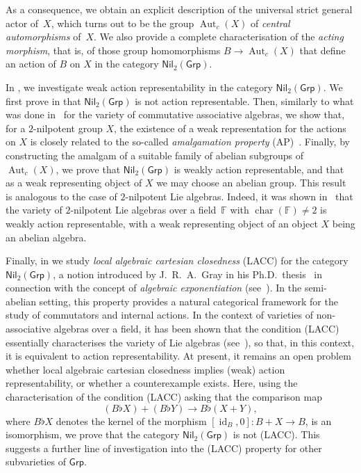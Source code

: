 \documentclass[reqno,hidelinks,a4paper]{amsart}
\theoremstyle{plain}
\theoremstyle{definition}
\theoremstyle{remark}
\numberwithin{equation}{section}
\newcommand*{\CondName}[1]{{\rm (#1)}}
\newcommand*{\LACC}{\CondName{LACC}}
\newcommand{\F}{\mathbb{F}}
\DeclareMathOperator{\bchar}{char}
\DeclareMathOperator{\Aut}{Aut}
\DeclareMathOperator{\id}{id}
\newcommand{\Grp}{\ensuremath{\mathsf{Grp}}}
\newcommand{\Nil}{\ensuremath{\mathsf{Nil}}}
\begin{document}
As a consequence, we obtain an explicit description of the universal strict general actor of~\(X\), which turns out to be the group \(\Aut_c(X)\) of \emph{central automorphisms} of~\(X\). We also provide a complete characterisation of the \emph{acting morphism}, that is, of those group homomorphisms \(B \to \Aut_c(X)\) that define an action of \(B\) on \(X\) in the category \(\Nil_2(\Grp)\).

In , we investigate weak action representability in the category \(\Nil_2(\Grp)\). We first prove in  that \(\Nil_2(\Grp)\) is not action representable. Then, similarly to what was done in~\cite{WRAAlg} for the variety of commutative associative algebras, we show that, for a \(2\)-nilpotent group \(X\), the existence of a weak representation for the actions on \(X\) is closely related to the so-called \emph{amalgamation property} (AP)~\cite{kiss}. Finally, by constructing the amalgam of a suitable family of abelian subgroups of \(\Aut_c(X)\), we prove that \(\Nil_2(\Grp)\) is weakly action representable, and that as a weak representing object of \(X\) we may choose an abelian group. This result is analogous to the case of \(2\)-nilpotent Lie algebras. Indeed, it was shown in~\cite[Theorem 2.21]{WRAAlg} that the variety of \(2\)-nilpotent Lie algebras over a field~\(\F\) with \(\bchar(\F)\neq 2\) is weakly action representable, with a weak representing object of an object \(X\) being an abelian algebra.

Finally, in  we study \emph{local algebraic cartesian closedness} \LACC{} for the category \(\Nil_2(\Grp)\), a notion introduced by J.~R.~A.~Gray in his Ph.D.\ thesis~\cite{GrayThesis} in connection with the concept of \emph{algebraic exponentiation} (see~\cite{BournGray,GrayACS}). In the semi-abelian setting, this property provides a natural categorical framework for the study of commutators and internal actions. In the context of varieties of non-associative algebras over a field, it has been shown that the condition \LACC{} essentially characterises the variety of Lie algebras (see~\cite{GM-VdL2,GM-VdL3,GrayLie}), so that, in this context, it is equivalent to action representability. At present, it remains an open problem whether local algebraic cartesian closedness implies (weak) action representability, or whether a counterexample exists. Here, using the characterisation of the condition \LACC{} asking that the comparison map
\[
    (B \flat X) + (B \flat Y) \to B \flat (X+Y),
\]
where \(B \flat X\) denotes the kernel of the morphism \([\id_B,0]\colon {B+X\to B}\), is an isomorphism, we prove that the category \(\Nil_2(\Grp)\) is not \LACC{}. This suggests a further line of investigation into the \LACC{} property for other subvarieties of \(\Grp\).
\end{document}
